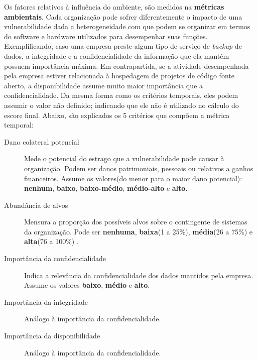			Os fatores relativos à influência do ambiente, são medidos na \textbf{métricas
			ambientais}. Cada organização pode sofrer diferentemente o impacto de uma
			vulnerabilidade dada a heterogeneidade com que podem se organizar em termos
			do software e hardware utilizados para desempenhar suas funções.
			Exemplificando, caso uma empresa preste algum tipo de serviço de \textsl{backup} de
			dados, a integridade e a confidencialidade da informação que ela mantém
			possuem importância máxima. Em contrapartida, se a atividade desempenhada pela
			empresa estiver relacionada à hospedagem de projetos de código fonte aberto,
			a disponibilidade assume muito maior importância que a confidencialidade.
			Da mesma forma como os critérios temporais, eles podem assumir o valor não definido;
			indicando que ele não é utilizado no cálculo do escore final.
			Abaixo, são explicados os 5 critérios que compõem a métrica temporal:
			\begin{description}
				\item[Dano colateral potencial]{
					Mede o potencial do estrago que a vulnerabilidade pode causar à organização.
					Podem ser danos patrimoniais, pessoais ou relativos a ganhos financeiros.
					Assume os valores(do menor para o maior dano potencial):
					\textbf{nenhum}, \textbf{baixo}, \textbf{baixo-médio}, \textbf{médio-alto} e
					\textbf{alto}}.
				\item[Abundância de alvos]{Mensura a proporção dos possíveis alvos
					sobre o contingente de sistemas da organização.
					Pode ser \textbf{nenhuma}, \textbf{baixa}(1 a 25\%), 
					\textbf{média}(26 a 75\%) e \textbf{alta}(76 a 100\%)
					.}
				\item[Importância da confidencialidade]{Indica a relevância da
					confidencialidade dos dados mantidos pela empresa. Assume os valores
					\textbf{baixo}, \textbf{médio} e \textbf{alto}.}
				\item[Importância da integridade]{Análogo à importância da confidencialidade.}
				\item[Importância da disponibilidade]{Análogo à importância da confidencialidade.}
			\end{description}
		

